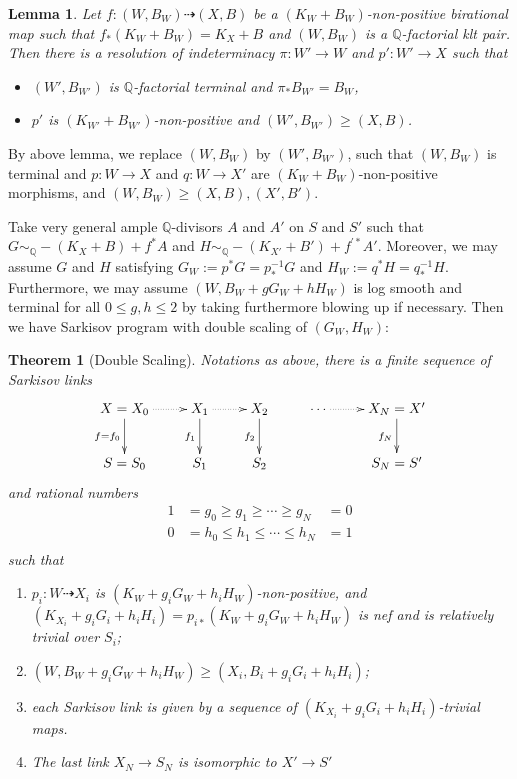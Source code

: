 \documentclass{article}
\newtheorem{lem}[defn]{Lemma}
\newtheorem{thm}[defn]{Theorem}
\begin{document}
\begin{lem}
Let $f:(W,B_W)\dashrightarrow (X,B)$ be a $(K_W+B_W)$-non-positive birational map such that $f_*(K_W+B_W)=K_X+B$ and $(W,B_W)$ is a $\mathbb{Q}$-factorial klt pair. Then there is a resolution of indeterminacy $\pi:W'\to W $ and $p':W'\to X$ such that
\begin{itemize}
  \item $(W',B_{W'})$ is $\mathbb{Q}$-factorial terminal and $\pi_*B_{W'}=B_W$,
  \item $p'$ is $(K_{W'}+B_{W'})$-non-positive and $(W',B_{W'})\geqslant (X,B)$.
\end{itemize}
\end{lem}
By  above lemma, we replace $(W,B_W)$ by $(W',B_{W'})$, such that $(W,B_{W})$ is terminal and $p:W\to X$ and $q:W\to X'$ are $(K_W+B_W)$-non-positive morphisms, and $(W,B_W)\geqslant (X,B),(X',B')$. 

Take  very general ample $\mathbb{Q}$-divisors $ A $ and $ A' $ on $ S $ and $ S' $ such that $ G\sim_{\mathbb{Q}}-(K_X+B)+f^*A $ and $ H\sim_{\mathbb{Q}}-(K_{X'}+B')+f^{'*}A' $. Moreover, we may assume $ G $ and $ H $ satisfying $G_{W}:= p^*G=p^{-1}_*G $ and $ H_{W}:=q^*H=q^{-1}_*H $.
Furthermore, we may assume $(W,B_W+gG_W+hH_W)$ is log smooth and terminal for all $0\leqslant g,h\leqslant 2$ by taking furthermore blowing up if necessary.
Then we have Sarkisov program with double scaling of $(G_{W},H_{W})$: 
\begin{thm}[Double Scaling]\label{maintheorem2}
Notations as above, there is a finite sequence of Sarkisov links
\[
  \xymatrix{
    X=X_0\ar@{.>}[r]\ar[d]_{f=f_{0}}&X_{1}\ar@{.>}[r]\ar[d]_{f_{1}}& X_{2}\ar[d]_{f_{2}} &\cdots\ar@{.>}[r]&X_N=X'\ar[d]_{f_{N}} \\
    S=S_{0}&S_{1} &S_{2}&&S_N=S'
  }
\]
and rational numbers
\[
  \begin{aligned}
    1&=g_0\geqslant g_1 \geqslant \cdots \geqslant g_N&=0\\
    0&=h_0\leqslant h_{1} \leqslant \cdots \leqslant h_N&=1\\
  \end{aligned}
\]
such that 
\begin{enumerate}
  \item $p_i:W\dashrightarrow  X_{i}$ is $(K_{W}+g_{i}G_{W}+h_{i}H_{W})$-non-positive, and $(K_{X_{i}}+g_{i}G_{i}+h_{i}H_{i})=p_{i*}(K_{W}+g_{i}G_{W}+h_{i}H_{W})$ is nef and is relatively trivial over $S_{i}$;
  \item $(W,B_{W}+g_{i}G_{W}+h_{i}H_{W})\geqslant (X_{i},B_{i}+g_{i}G_{i}+h_{i}H_{i})$;
  \item each Sarkisov link is given by a sequence of $(K_{X_{i}}+g_{i}G_{i}+h_{i}H_{i})$-trivial maps.
    \item  The last link $X_{N} \to S_{N}$ is isomorphic to $X'\to S'$
\end{enumerate}
\end{thm}
\end{document}
